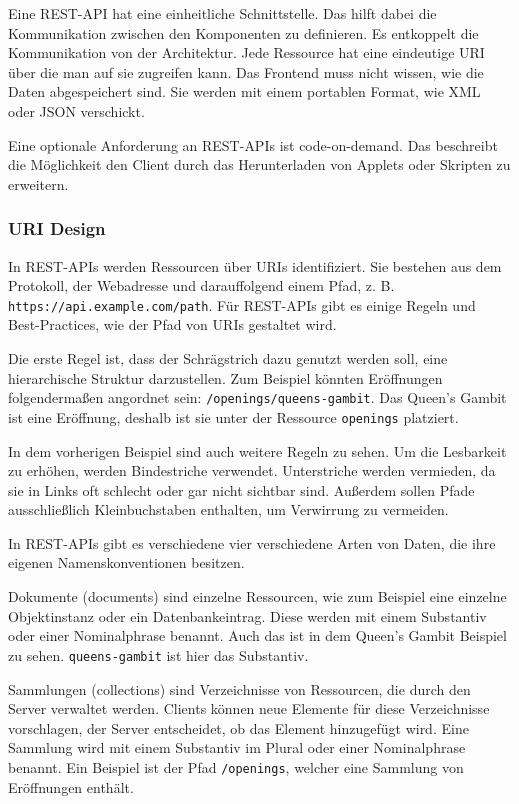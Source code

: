 Eine REST-API hat eine einheitliche Schnittstelle. Das hilft dabei die Kommunikation zwischen den Komponenten zu definieren. Es entkoppelt die Kommunikation von der Architektur. Jede Ressource hat eine eindeutige URI über die man auf sie zugreifen kann. Das Frontend muss nicht wissen, wie die Daten abgespeichert sind. Sie werden mit einem portablen Format, wie XML oder JSON verschickt.

Eine optionale Anforderung an REST-APIs ist code-on-demand. Das beschreibt die Möglichkeit den Client durch das Herunterladen von Applets oder Skripten zu erweitern.
\cite{fielding_architectural_2000}\cite{de_api_2017}

\subsubsection{URI Design}
In REST-APIs werden Ressourcen über \ac{URI}s identifiziert. Sie bestehen aus dem Protokoll, der Webadresse und darauffolgend einem Pfad, z. B. \lstinline{https://api.example.com/path}. Für REST-APIs gibt es einige Regeln und Best-Practices, wie der Pfad von \ac{URI}s gestaltet wird.

Die erste Regel ist, dass der Schrägstrich dazu genutzt werden soll, eine hierarchische Struktur darzustellen. Zum Beispiel könnten Eröffnungen folgendermaßen angordnet sein: \lstinline{/openings/queens-gambit}. Das Queen's Gambit ist eine Eröffnung, deshalb ist sie unter der Ressource \lstinline{openings} platziert.

In dem vorherigen Beispiel sind auch weitere Regeln zu sehen. Um die Lesbarkeit zu erhöhen, werden Bindestriche verwendet. Unterstriche werden vermieden, da sie in Links oft schlecht oder gar nicht sichtbar sind. Außerdem sollen Pfade ausschließlich Kleinbuchstaben enthalten, um Verwirrung zu vermeiden.

In REST-APIs gibt es verschiedene vier verschiedene Arten von Daten, die ihre eigenen Namenskonventionen besitzen.

Dokumente (documents) sind einzelne Ressourcen, wie zum Beispiel eine einzelne Objektinstanz oder ein Datenbankeintrag. Diese werden mit einem Substantiv oder einer Nominalphrase benannt. Auch das ist in dem Queen's Gambit Beispiel zu sehen. \lstinline{queens-gambit} ist hier das Substantiv.

Sammlungen (collections) sind Verzeichnisse von Ressourcen, die durch den Server verwaltet werden. Clients können neue Elemente für diese Verzeichnisse vorschlagen, der Server entscheidet, ob das Element hinzugefügt wird. Eine Sammlung wird mit einem Substantiv im Plural oder einer Nominalphrase benannt. Ein Beispiel ist der Pfad \lstinline{/openings}, welcher eine Sammlung von Eröffnungen enthält.

